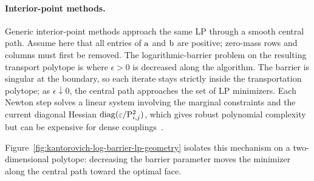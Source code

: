 \paragraph{Interior-point methods.}

Generic interior-point methods approach the same LP through a smooth central path. Assume here that all entries of $\mathrm{a}$ and $\mathrm{b}$ are positive; zero-mass rows and columns must first be removed. The logarithmic-barrier problem on the resulting transport polytope is
where $\epsilon>0$ is decreased along the algorithm. The barrier is singular at the boundary, so each iterate stays strictly inside the transportation polytope; as $\epsilon\downarrow0$, the central path approaches the set of LP minimizers. Each Newton step solves a linear system involving the marginal constraints and the current diagonal Hessian $\operatorname{diag}(\varepsilon/\mathrm{P}_{i,j}^2)$, which gives robust polynomial complexity but can be expensive for dense couplings~\cite{nesterov1994interior}.

Figure~\ref{fig:kantorovich-log-barrier-lp-geometry} isolates this mechanism on a two-dimensional polytope: decreasing the barrier parameter moves the minimizer along the central path toward the optimal face.

